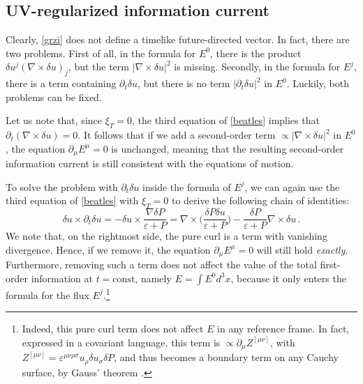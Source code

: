 \documentclass[a4paper, amsfonts, amssymb, amsmath, reprint, showkeys, nofootinbib, twoside,notitlepage,onecolumn,preprintnumbers]{revtex4-2}
\theoremstyle{definition}
\theoremstyle{theorem}
\theoremstyle{corollary}
\begin{document}
\subsection{UV-regularized information current}

Clearly, \eqref{grzi} does not define a timelike future-directed vector. In fact, there are two problems. First of all, in the formula for $E^0$, there is the product $\delta u^j (\nabla {\times} \delta u)_j$, but the term $|\nabla {\times} \delta u|^2$ is missing. Secondly, in the formula for $E^j$, there is a term containing $\partial_t \delta u$, but there is no term $|\partial_t \delta u|^2$ in $E^0$. Luckily, both problems can be fixed.

Let us note that, since $\xi_T=0$, the third equation of \eqref{beatles} implies that $\partial_t (\nabla {\times} \delta u)=0$. It follows that if we add a second-order term $\propto |\nabla {\times} \delta u|^2$ in $E^0$, the equation $\partial_\mu E^\mu =0$ is unchanged, meaning that the resulting second-order information current is still consistent with the equations of motion. 

To solve the problem with $\partial_t \delta u$ inside the formula of $E^j$, we can again use the third equation of \eqref{beatles} with $\xi_T=0$ to derive the following chain of identities:
\begin{equation}
  \delta u \times \partial_t \delta u = -\delta u \times \dfrac{\nabla \delta P }{\varepsilon{+}P} = \nabla \times \bigg( \dfrac{\delta P \delta u}{\varepsilon{+}P} \bigg) -\dfrac{\delta P}{\varepsilon{+}P} \nabla \times \delta u \, .
\end{equation}
We note that, on the rightmost side, the pure curl is a term with vanishing divergence. Hence, if we remove it, the equation $\partial_\mu E^\mu =0$ will still hold \textit{exactly}. Furthermore, removing such a term does not affect the value of the total first-order information at $t=\text{const}$, namely $E=\int E^0 d^3 x$, because it only enters the formula for the flux $E^j$.\footnote{Indeed, this pure curl term does not affect $E$ in any reference frame. In fact, expressed in a covariant language, this term is $\propto \partial_\mu Z^{[\mu \nu]}$, with $Z^{[\mu \nu]}=\varepsilon^{\mu \nu \rho \sigma} u_\rho \delta u_\sigma \delta P $, and thus becomes a boundary term on any Cauchy surface, by Gauss' theorem \cite{Poisson_notes}.}
\end{document}
